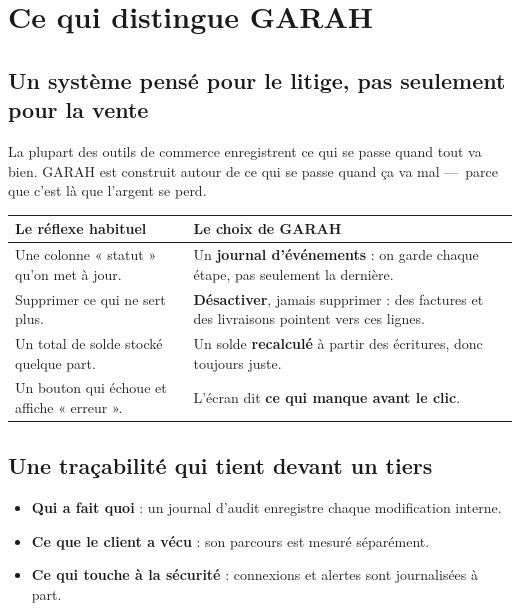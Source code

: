 \documentclass[11pt,a4paper]{article}
\begin{document}
\newpage
\section{Ce qui distingue GARAH}

\subsection{Un système pensé pour le litige, pas seulement pour la vente}

La plupart des outils de commerce enregistrent ce qui se passe quand tout va
bien. GARAH est construit autour de ce qui se passe quand ça va mal —~parce
que c'est là que l'argent se perd.

\begin{center}
\begin{tabularx}{\textwidth}{@{}>{\raggedright\arraybackslash}X>{\raggedright\arraybackslash}X@{}}
\toprule
\textbf{Le réflexe habituel} & \textbf{Le choix de GARAH} \\
\midrule
Une colonne « statut » qu'on met à jour. &
Un \textbf{journal d'événements} : on garde chaque étape, pas seulement la
dernière. \\
\addlinespace
Supprimer ce qui ne sert plus. &
\textbf{Désactiver}, jamais supprimer : des factures et des livraisons
pointent vers ces lignes. \\
\addlinespace
Un total de solde stocké quelque part. &
Un solde \textbf{recalculé} à partir des écritures, donc toujours juste. \\
\addlinespace
Un bouton qui échoue et affiche « erreur ». &
L'écran dit \textbf{ce qui manque avant le clic}. \\
\bottomrule
\end{tabularx}
\end{center}

\subsection{Une traçabilité qui tient devant un tiers}

\begin{itemize}
  \item \textbf{Qui a fait quoi} : un journal d'audit enregistre chaque
        modification interne.
  \item \textbf{Ce que le client a vécu} : son parcours est mesuré séparément.
  \item \textbf{Ce qui touche à la sécurité} : connexions et alertes sont
        journalisées à part.
\end{itemize}
\end{document}
